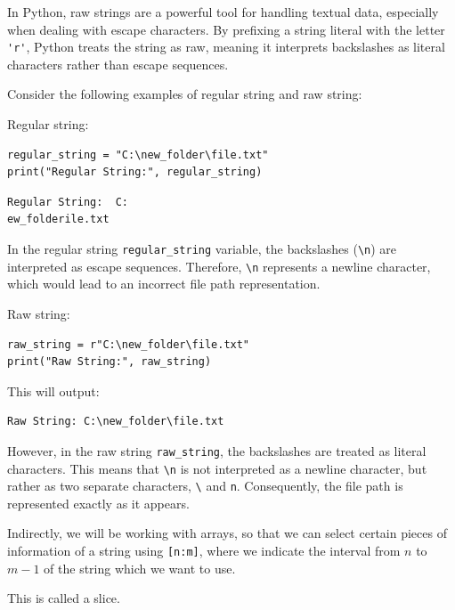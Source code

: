 \documentclass[../../data_analysis_python.tex]{subfiles}
\begin{document}
    In Python, raw strings are a powerful tool for handling textual data, especially when dealing with escape characters. By prefixing a string literal with the letter \lstinline|'r'|, Python treats the string as raw, meaning it interprets backslashes as literal characters rather than escape sequences.

    Consider the following examples of regular string and raw string:

    Regular string:

    \begin{lstlisting}[caption={caption},label=DescriptiveLabel]
regular_string = "C:\new_folder\file.txt"
print("Regular String:", regular_string)
    \end{lstlisting}

    \begin{lstlisting}[caption={caption},label=DescriptiveLabel]
Regular String:  C:
ew_folderile.txt
    \end{lstlisting}

    In the regular string \lstinline|regular_string| variable, the backslashes (\lstinline|\n|) are interpreted as escape sequences. Therefore, \lstinline|\n| represents a newline character, which would lead to an incorrect file path representation.

    Raw string:
    \begin{lstlisting}[caption={caption},label=DescriptiveLabel]
raw_string = r"C:\new_folder\file.txt"
print("Raw String:", raw_string)
    \end{lstlisting}

    This will output:

    \begin{lstlisting}[caption={caption},label=DescriptiveLabel]
Raw String: C:\new_folder\file.txt
    \end{lstlisting}

    However, in the raw string \lstinline|raw_string|, the backslashes are treated as literal characters. This means that \lstinline|\n| is not interpreted as a newline character, but rather as two separate characters, \lstinline|\| and \lstinline|n|. Consequently, the file path is represented exactly as it appears.

    \begin{obs}
        Indirectly, we will be working with arrays, so that we can select certain pieces of information of a string using \lstinline|[n:m]|, where we indicate the interval from $n$ to $m-1$ of the string which we want to use.

        This is called a slice.
    \end{obs}
\end{document}
